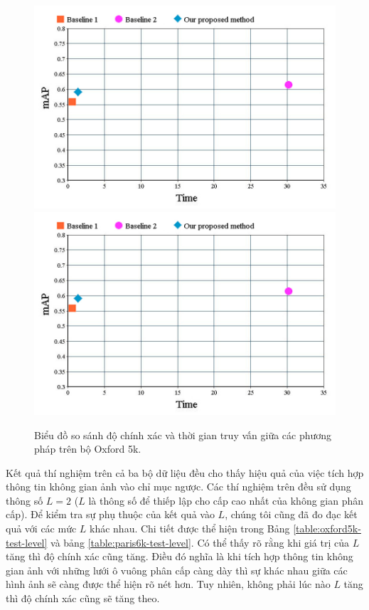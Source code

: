 \begin{figure}[!htbp]
  \begin{center}
    \leavevmode
    \ifpdf
      \includegraphics[scale=0.4]{chart}
    \else
      \includegraphics[scale=0.4]{chart}
    \fi
    \caption[Biểu đồ so sánh độ chính xác và thời gian truy vấn giữa các phương pháp]{Biểu đồ so sánh độ chính xác và thời gian truy vấn giữa các phương pháp trên bộ Oxford 5k.}
    \label{FigCharts}
  \end{center}
\end{figure}

Kết quả thí nghiệm trên cả ba bộ dữ liệu đều cho thấy hiệu quả của việc tích hợp thông tin không gian ảnh vào chỉ mục ngược. Các thí nghiệm trên đều sử dụng thông số $L = 2$ ($L$ là thông số để thiếp lập cho cấp cao nhất của không gian phân cấp). Để kiểm tra sự phụ thuộc của kết quả vào $L$, chúng tôi cũng đã đo đạc kết quả với các mức $L$ khác nhau. Chi tiết được thể hiện trong Bảng \ref{table:oxford5k-test-level} và bảng \ref{table:paris6k-test-level}. Có thể thấy rõ rằng khi giá trị của $L$ tăng thì độ chính xác cũng tăng. Điều đó nghĩa là khi tích hợp thông tin không gian ảnh với những lưới ô vuông phân cấp càng dày thì sự khác nhau giữa các hình ảnh sẽ càng được thể hiện rõ nét hơn. Tuy nhiên, không phải lúc nào $L$ tăng thì độ chính xác cũng sẽ tăng theo.

